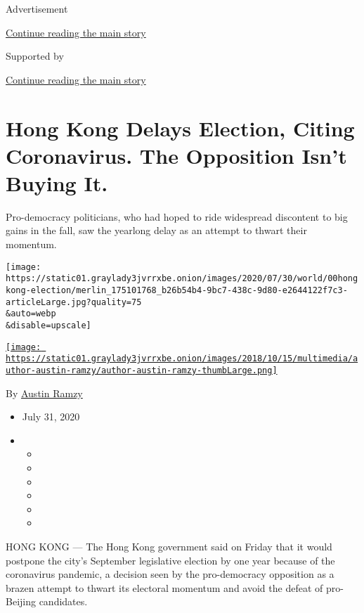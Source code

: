 Advertisement

\protect\hyperlink{after-top}{Continue reading the main story}

Supported by

\protect\hyperlink{after-sponsor}{Continue reading the main story}

\hypertarget{hong-kong-delays-election-citing-coronavirus-the-opposition-isnt-buying-it}{%
\section{Hong Kong Delays Election, Citing Coronavirus. The Opposition
Isn't Buying
It.}\label{hong-kong-delays-election-citing-coronavirus-the-opposition-isnt-buying-it}}

Pro-democracy politicians, who had hoped to ride widespread discontent
to big gains in the fall, saw the yearlong delay as an attempt to thwart
their momentum.

\texttt{[image: https://static01.graylady3jvrrxbe.onion/images/2020/07/30/world/00hongkong-election/merlin\_175101768\_b26b54b4-9bc7-438c-9d80-e2644122f7c3-articleLarge.jpg?quality=75\\\&auto=webp\\\&disable=upscale]}

\href{https://www.nytimes3xbfgragh.onion/by/austin-ramzy}{\texttt{[image: https://static01.graylady3jvrrxbe.onion/images/2018/10/15/multimedia/author-austin-ramzy/author-austin-ramzy-thumbLarge.png]}}

By \href{https://www.nytimes3xbfgragh.onion/by/austin-ramzy}{Austin
Ramzy}

\begin{itemize}
\item
  July 31, 2020
\item
  \begin{itemize}
  \item
  \item
  \item
  \item
  \item
  \item
  \end{itemize}
\end{itemize}

HONG KONG --- The Hong Kong government said on Friday that it would
postpone the city's September legislative election by one year because
of the coronavirus pandemic, a decision seen by the pro-democracy
opposition as a brazen attempt to thwart its electoral momentum and
avoid the defeat of pro-Beijing candidates.

